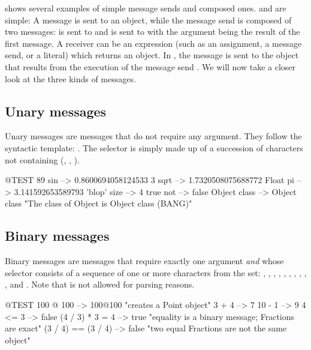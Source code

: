 \documentclass[a4paper,10pt,twoside]{book}
\begin{document}
 shows several examples of simple message sends and composed ones.
 and  are simple:
A message is sent to an object, while the message send  is composed of two messages:
 is sent to  and  is sent to  with the argument being the result of the first message.
A receiver can be an expression (such as an assignment, a message send, or a literal) which returns an object.
In , the message  is sent to the object that results from the execution of the message send .
We will now take a closer look at the three kinds of messages.

\subsection{Unary messages}
Unary messages are messages that do not require any argument.
They follow the syntactic template: .
The selector is simply made up of a succession of characters not containing \ct{:} (\eg {}, , ).
\begin{code}{@TEST}
89 sin           --> 0.8600694058124533
3 sqrt           --> 1.7320508075688772
Float pi         --> 3.141592653589793
'blop' size     --> 4
true not        --> false
Object class --> Object class  "The class of Object is Object class (BANG)"
\end{code}


\subsection{Binary messages} 
Binary messages are messages that require exactly one argument \emph{and} whose selector consists of a sequence of one or more characters from the set: \ct{+}, \ct{-}, \ct{*}, \ct{/}, \ct{&}, \ct{=}, \ct{>}, \ct{|}, \ct{<}, \ct{~}, and .
Note that \ct{--} is not allowed for parsing reasons.

\begin{code}{@TEST}
100 @ 100      --> 100@100  "creates a Point object"
3 + 4              --> 7
10 - 1            --> 9
4 <= 3            --> false
(4 / 3) * 3 = 4   --> true  "equality is a binary message; Fractions are exact"
(3 / 4) == (3 / 4) --> false  "two equal Fractions are not the same object"
\end{code}
\end{document}

